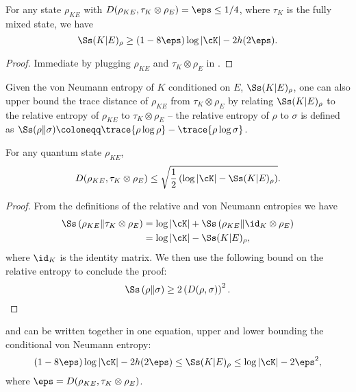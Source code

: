\begin{cor}
  \label{cor:AF04}
 For any state $\rho_{KE}$ with $D(\rho_{KE},\tau_K \otimes
  \rho_E) = \eps \leq 1/4$, where $\tau_K$ is the fully mixed state,
  we have
  \[ \Ss(K|E)_{\rho} \geq (1- 8\eps) \log |\cK| - 2h(2\eps) . \]
\end{cor}

\begin{proof}
  Immediate by plugging $\rho_{KE}$ and $\tau_K \otimes \rho_E$ in
  .
\end{proof}

Given the von Neumann entropy of $K$ conditioned on $E$,
$\Ss(K|E)_{\rho}$, one can also upper bound the trace distance of
$\rho_{KE}$ from $\tau_K \otimes \rho_E$ by relating $\Ss(K|E)_{\rho}$
to the relative entropy of $\rho_{KE}$ to $\tau_K \otimes \rho_E$ \---
the relative entropy of $\rho$ to $\sigma$ is defined as $\Ss(\rho \|
\sigma) \coloneqq \trace{\rho \log \rho} - \trace{\rho \log \sigma}$.

\begin{lem}
  \label{lem:entropybound}
  For any quantum state $\rho_{KE}$,
  \[ D(\rho_{KE},\tau_K \otimes \rho_E) \leq
  \sqrt{\frac{1}{2}\left(\log |\cK| - \Ss(K|E)_{\rho}\right)} . \]
\end{lem}

\begin{proof}
  From the definitions of the relative and von Neumann entropies we
  have
  \begin{align*}
    \Ss \left(\rho_{KE} \middle\| \tau_K \otimes \rho_E \right) & =
  \log |\cK| + \Ss \left(\rho_{KE} \middle\| \id_K \otimes \rho_E
  \right) \\ & = \log |\cK| - \Ss(K|E)_{\rho},\end{align*} where $\id_K$ is the
  identity matrix. We then use the following bound on the relative
  entropy \cite[Theorem~1.15]{OP93} to conclude the proof:
  \[ \Ss\left(\rho \middle\| \sigma \right) \geq 2
  \left(D(\rho,\sigma)\right)^2. \qedhere\]
\end{proof}

 and  can be written
together in one equation, upper and lower bounding the conditional von
Neumann entropy:
\[ (1- 8\eps) \log |\cK| - 2h(2\eps) \leq \Ss(K|E)_{\rho} \leq \log
|\cK| - 2\eps^2, \] where $\eps = D(\rho_{KE},\tau_K \otimes
\rho_E)$.

